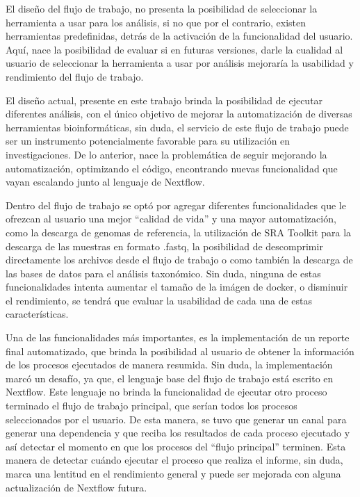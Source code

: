 \documentclass[12pt]{article}
\begin{document}
El diseño del flujo de trabajo, no presenta la posibilidad de seleccionar la herramienta a usar para los análisis, si no que por el contrario, existen herramientas predefinidas, detrás de la activación de la funcionalidad del usuario. Aquí, nace la posibilidad  de evaluar si en futuras versiones, darle la cualidad al usuario de seleccionar la herramienta a usar por análisis mejoraría la usabilidad y rendimiento del flujo de trabajo. 

El diseño actual, presente en este trabajo brinda la posibilidad de ejecutar diferentes análisis, con el único objetivo de mejorar la automatización de diversas herramientas bioinformáticas, sin duda, el servicio de este flujo de trabajo puede ser un instrumento potencialmente favorable para su utilización en investigaciones. De lo anterior, nace la problemática de seguir mejorando la automatización, optimizando el código, encontrando nuevas funcionalidad que vayan escalando junto al lenguaje de Nextflow.

Dentro del flujo de trabajo se optó por agregar diferentes funcionalidades que le ofrezcan al usuario una mejor “calidad de vida” y una mayor automatización, como la descarga de genomas de referencia, la utilización de SRA Toolkit para la descarga de las muestras en formato .fastq, la posibilidad de descomprimir directamente los archivos desde el flujo de trabajo o como también la descarga de las bases de datos para el análisis taxonómico. Sin duda, ninguna de estas funcionalidades intenta aumentar el tamaño de la imágen de docker, o disminuir el rendimiento, se tendrá que evaluar la usabilidad de cada una de estas características.

Una de las funcionalidades más importantes, es la implementación de un reporte final automatizado, que brinda la posibilidad al usuario de obtener la información de los procesos ejecutados de manera resumida. Sin duda, la implementación marcó un desafío, ya que, el lenguaje base del flujo de trabajo está escrito en Nextflow. Este lenguaje no brinda la funcionalidad de ejecutar otro proceso terminado el flujo de trabajo principal, que serían todos los procesos seleccionados por el usuario. De esta manera, se tuvo que generar un canal para generar una dependencia y que reciba los resultados de cada proceso ejecutado y así detectar el momento en que los procesos del “flujo principal” terminen. Esta manera de detectar cuándo ejecutar el proceso que realiza el informe, sin duda, marca una lentitud en el rendimiento general y puede ser mejorada con alguna actualización de Nextflow futura.
\end{document}
